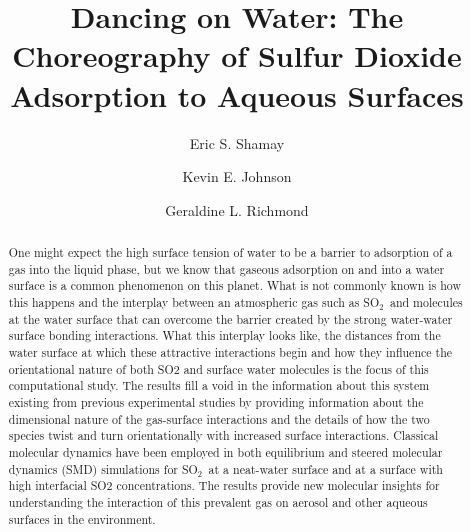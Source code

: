 \documentclass{article}
\title{Dancing on Water: The Choreography of Sulfur Dioxide Adsorption to Aqueous Surfaces}
\author{Eric S. Shamay \and Kevin E. Johnson \and Geraldine L. Richmond}
\begin{document}
\newcommand{\suldiox}{SO$_2$}
\newcommand{\ang}{\,$\textrm{\AA}$}
\newcommand{\angs}{\ang}
\newcommand{\wat}{H$_2$O}

\maketitle

\linenumbers 
\doublespacing


\begin{abstract}
One might expect the high surface tension of water to be a barrier to adsorption of a gas into the liquid phase, but we know that gaseous adsorption on and into a water surface is a common phenomenon on this planet.  What is not commonly known is how this happens and the interplay between an atmospheric gas such as \suldiox~and molecules at the water surface that can overcome the barrier created by the strong water-water surface bonding interactions.  What this interplay looks like, the distances from the water surface at which these attractive interactions begin and how they influence the orientational nature of both SO2 and surface water molecules is the focus of this computational study.  The results fill a void in the information about this system existing from previous experimental studies by providing information about the dimensional nature of the gas-surface interactions and the details of how the two species twist and turn orientationally with increased surface interactions.  Classical molecular dynamics have been employed in both equilibrium and steered molecular dynamics (SMD) simulations for \suldiox~at a neat-water surface and at a surface with high interfacial SO2 concentrations.  The results provide new molecular insights for understanding the interaction of this prevalent gas on aerosol and other aqueous surfaces in the environment.
\end{abstract}







\end{document}
